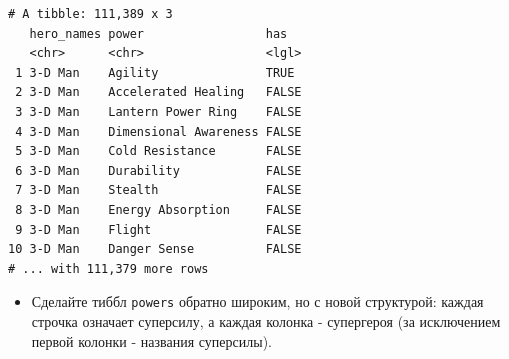 \documentclass[
]{book}
\newenvironment{Shaded}{\begin{snugshade}}{\end{snugshade}}
\newcommand{\DataTypeTok}[1]{\textcolor[rgb]{0.13,0.29,0.53}{#1}}
\newcommand{\KeywordTok}[1]{\textcolor[rgb]{0.13,0.29,0.53}{\textbf{#1}}}
\newcommand{\NormalTok}[1]{#1}
\newcommand{\OperatorTok}[1]{\textcolor[rgb]{0.81,0.36,0.00}{\textbf{#1}}}
\newcommand{\StringTok}[1]{\textcolor[rgb]{0.31,0.60,0.02}{#1}}
\providecommand{\tightlist}{%
  \setlength{\itemsep}{0pt}\setlength{\parskip}{0pt}}
\begin{document}
\begin{Shaded}
\end{Shaded}

\begin{verbatim}
# A tibble: 111,389 x 3
   hero_names power                 has  
   <chr>      <chr>                 <lgl>
 1 3-D Man    Agility               TRUE 
 2 3-D Man    Accelerated Healing   FALSE
 3 3-D Man    Lantern Power Ring    FALSE
 4 3-D Man    Dimensional Awareness FALSE
 5 3-D Man    Cold Resistance       FALSE
 6 3-D Man    Durability            FALSE
 7 3-D Man    Stealth               FALSE
 8 3-D Man    Energy Absorption     FALSE
 9 3-D Man    Flight                FALSE
10 3-D Man    Danger Sense          FALSE
# ... with 111,379 more rows
\end{verbatim}

\begin{itemize}
\tightlist
\item
  Сделайте тиббл \texttt{powers} обратно широким, но с новой структурой: каждая строчка означает суперсилу, а каждая колонка - супергероя (за исключением первой колонки - названия суперсилы).
\end{itemize}

\begin{Shaded}
\end{Shaded}
\end{document}
